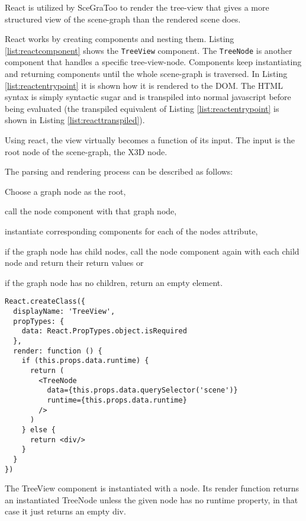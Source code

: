 React is utilized by \gls{SceGraToo} to render the tree-view that gives a more
structured view of the scene-graph than the rendered scene does.

React works by creating components and nesting them. Listing
\ref{list:reactcomponent} shows the \texttt{TreeView} component. The
\texttt{TreeNode} is another component that handles a specific tree-view-node.
Components keep instantiating and returning components until the whole
scene-graph is traversed. In Listing \ref{list:reactentrypoint} it is shown how
it is rendered to the \gls{DOM}. The \gls{HTML} syntax is simply syntactic sugar and is
transpiled into normal javascript before being evaluated (the transpiled
equivalent of Listing \ref{list:reactentrypoint} is shown in Listing
\ref{list:reacttranspiled}).

Using react, the view virtually becomes a function of its input. The input is the root node of the scene-graph, the \gls{X3D} node.

The parsing and rendering process can be described as follows:
\begin{enumerate*}
  \item Choose a graph node as the root,
  \item call the node component with that graph node,
  \item instantiate corresponding components for each of the nodes attribute,
  \item if the graph node has child nodes, call the node component again with each child node and return their return values or
  \item if the graph node has no children, return an empty element.
\end{enumerate*}

\begin{listing}
  \begin{verbatim}
React.createClass({
  displayName: 'TreeView',
  propTypes: {
    data: React.PropTypes.object.isRequired
  },
  render: function () {
    if (this.props.data.runtime) {
      return (
        <TreeNode
          data={this.props.data.querySelector('scene')}
          runtime={this.props.data.runtime}
        />
      )
    } else {
      return <div/>
    }
  }
})
  \end{verbatim}
  \caption{The TreeView component is instantiated with a node. Its render function returns an instantiated TreeNode unless the given node has no runtime property, in that case it just returns an empty div.}
  \label{list:reactcomponent}
\end{listing}

